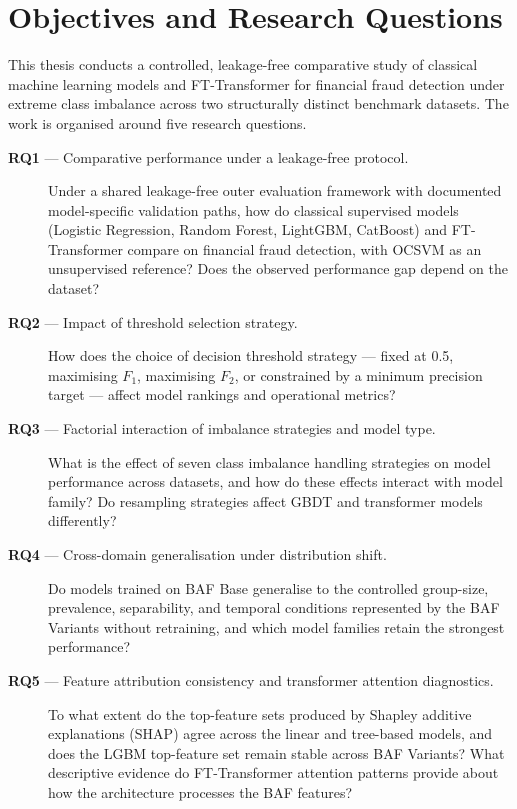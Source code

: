 \section{Objectives and Research Questions}
\label{subsec:objectives}

This thesis conducts a controlled, leakage-free comparative study of classical machine learning models and FT-Transformer for financial fraud detection under extreme class imbalance across two structurally distinct benchmark datasets. The work is organised around five research questions.

\begin{description}

  \item[\textbf{RQ1} — Comparative performance under a leakage-free protocol.]
  Under a shared leakage-free outer evaluation framework with documented model-specific validation paths, how do classical supervised models (Logistic Regression, Random Forest, LightGBM, CatBoost) and FT-Transformer compare on financial fraud detection, with OCSVM as an unsupervised reference? Does the observed performance gap depend on the dataset?

  \item[\textbf{RQ2} — Impact of threshold selection strategy.]
  How does the choice of decision threshold strategy — fixed at 0.5, maximising $F_1$, maximising $F_2$, or constrained by a minimum precision target — affect model rankings and operational metrics?

  \item[\textbf{RQ3} — Factorial interaction of imbalance strategies and model type.]
  What is the effect of seven class imbalance handling strategies on model performance across datasets, and how do these effects interact with model family? Do resampling strategies affect GBDT and transformer models differently?

  \item[\textbf{RQ4} — Cross-domain generalisation under distribution shift.]
  Do models trained on BAF Base generalise to the controlled group-size, prevalence, separability, and temporal conditions represented by the BAF Variants without retraining, and which model families retain the strongest performance?

  \item[\textbf{RQ5} — Feature attribution consistency and transformer attention diagnostics.]
  To what extent do the top-feature sets produced by Shapley additive explanations (SHAP) agree across the linear and tree-based models, and does the LGBM top-feature set remain stable across BAF Variants? What descriptive evidence do FT-Transformer attention patterns provide about how the architecture processes the BAF features?

\end{description}

